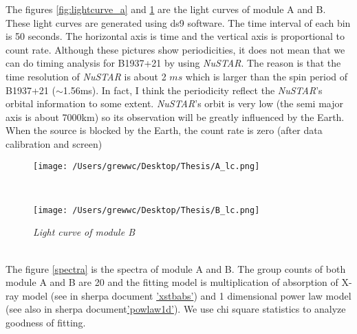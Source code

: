\documentclass[12pt]{report}
\newcommand{\mycaption}[1]{\caption{\textit{\footnotesize #1}}}
\begin{document}
        \indent  
        The figures \ref{fig:lightcurve_a} and \ref{fig:lightcurve_b} are the light curves of module A and B.
        These light curves are generated using ds9 software. The time interval of each bin is 50 seconds.
        The horizontal axis is time and the vertical axis is proportional to count rate. 
        Although these pictures show  periodicities, it does not mean that we can do timing analysis for B1937+21 
        by using \textit{NuSTAR}. The reason is that the time resolution of \textit{NuSTAR} is about 2 $ms$ which
        is larger than the spin period of B1937+21 ($\sim$1.56ms). In fact, I think the periodicity reflect the 
        \textit{NuSTAR}'s orbital information to some extent. \textit{NuSTAR}'s orbit is very low (the semi major
        axis is about 7000km) so its observation will be greatly influenced by the Earth. When the source is blocked
        by the Earth, the count rate is zero (after data calibration and screen) \\
        \begin{figure}[h]
          \begin{minipage}{\textwidth}
            \begin{center}
                \texttt{[image: /Users/grewwc/Desktop/Thesis/A\_lc.png]}
                \mycaption{Light curve of module A}
                \label{fig:lightcurve_a}
              \end{center}
            \end{minipage}
         \\ 
          \begin{minipage}{\textwidth}
            \centering
            \texttt{[image: /Users/grewwc/Desktop/Thesis/B\_lc.png]}
          \mycaption{Light curve of module B}
          \label{fig:lightcurve_b}
          \end{minipage}
        \end{figure}\\
        \indent 
        The figure \ref{spectra} is the spectra of module A and B. The group counts of both module A and B are
        20 and the fitting model is multiplication of absorption of X-ray model (see in sherpa document 
        \href{http://%
        cxc.harvard.edu/sherpa/ahelp/xstbabs.html}{'xstbabs'}) and 1 dimensional power law model (see also in sherpa 
        document\href{http://cxc.harvard.edu/sherpa/ahelp/powlaw1d.html}{'powlaw1d'}). We use chi square statistics
        to analyze goodness of fitting.\\
\end{document}
